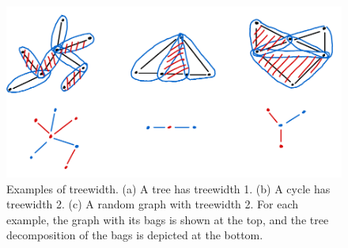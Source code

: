 \begin{figure}
    \includegraphics[width=\textwidth]{figures/treewidth-example.png}
    \caption{Examples of treewidth. (a) A tree has treewidth 1. (b) A cycle has treewidth 2. (c) A random graph with treewidth 2. For each example, the graph with its bags is shown at the top, and the tree decomposition of the bags is depicted at the bottom. }
    \label{fig:treewidth-example}
\end{figure}